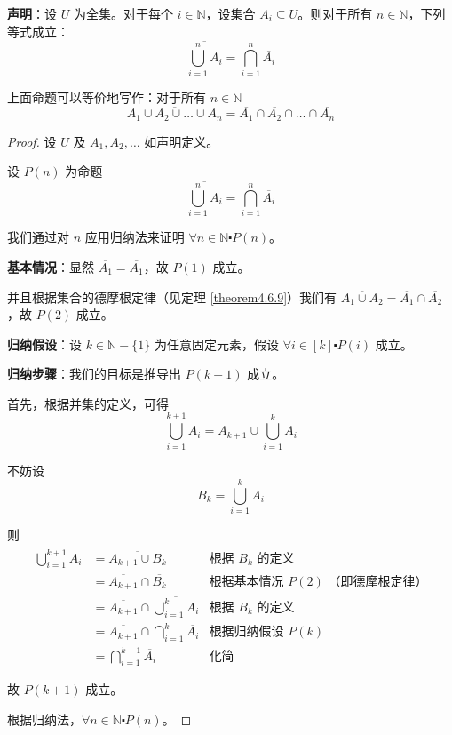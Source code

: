 \begin{example}[集合的广义德摩根定律：]

    \textbf{声明}：设 $U$ 为全集。对于每个 $i \in \mathbb{N}$，设集合 $A_i \subseteq U$。则对于所有 $n \in \mathbb{N}$，下列等式成立：
    \[\overline{\bigcup_{i=1}^{n} A_i} = \bigcap_{i=1}^{n} \overline{A_i}\]
    
    上面命题可以等价地写作：对于所有 $n \in \mathbb{N}$
    \[\overline{A_1 \cup A_2 \cup \dots \cup A_n} = \overline{A_1} \cap \overline{A_2} \cap \dots \cap \overline{A_n}\]

    \begin{proof}
        设 $U$ 及 $A_1, A_2, \dots$ 如声明定义。

        设 $P(n)$ 为命题
        \[\overline{\bigcup_{i=1}^{n} A_i} = \bigcap_{i=1}^{n} \overline{A_i}\]

        我们通过对 $n$ 应用归纳法来证明 $\forall n \in \mathbb{N} \centerdot P(n)$。

        \textbf{基本情况}：显然 $\overline{A_1} = \overline{A_1}$，故 $P(1)$ 成立。

        并且根据集合的德摩根定律（见定理 \ref{theorem4.6.9}）我们有 $\overline{A_1 \cup A_2} = \overline{A_1} \cap \overline{A_2}$，故 $P(2)$ 成立。

        \textbf{归纳假设}：设 $k \in \mathbb{N}-\{1\}$ 为任意固定元素，假设 $\forall i \in [k] \centerdot P(i)$ 成立。

        \textbf{归纳步骤}：我们的目标是推导出 $P(k+1)$ 成立。

        首先，根据并集的定义，可得
        \[\bigcup_{i=1}^{k+1} A_i = A_{k+1} \cup \bigcup_{i=1}^k A_i\]

        不妨设
        \[B_k = \bigcup_{i=1}^k A_i\]

        则
        \begin{align*}
            \overline{\bigcup_{i=1}^{k+1} A_i} &= \overline{A_{k+1} \cup B_k} & \text{根据\ } B_k \text{\ 的定义} \\
            &= \overline{A_{k+1}} \cap \overline{B_k} & \text{根据基本情况\ } P(2) \text{\ （即德摩根定律）}\\
            &= \overline{A_{k+1}} \cap \overline{\bigcup_{i=1}^k A_i} & \text{根据\ } B_k \text{\ 的定义} \\
            &= \overline{A_{k+1}} \cap \bigcap_{i=1}^k \overline{A_i} & \text{根据归纳假设\ } P(k) \\
            &= \bigcap_{i=1}^{k+1} \overline{A_i} & \text{化简}
        \end{align*}

        故 $P(k+1)$ 成立。

        根据归纳法，$\forall n \in \mathbb{N} \centerdot P(n)$。
    \end{proof}
\end{example}